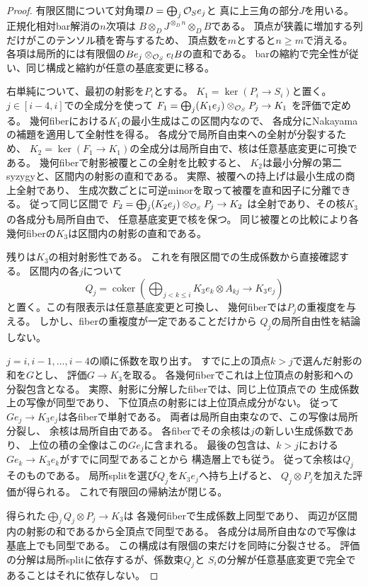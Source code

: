 \begin{proof}
有限区間について対角環$D=\bigoplus_j\mathcal O_S e_j$と
真に上三角の部分$J$を用いる。
正規化相対bar解消の$n$次項は
$B\otimes_D J^{\otimes_D n}\otimes_D B$である。
頂点が狭義に増加する列だけがこのテンソル積を寄与するため、
頂点数を$m$とすると$n\ge m$で消える。
各項は局所的には有限個の$Be_j\otimes_{\mathcal O_S} e_lB$の直和である。
barの縮約で完全性が従い、同じ構成と縮約が任意の基底変更に移る。

右単純について、最初の射影を$P_i$とする。
$K_1=\ker(P_i\to S_i)$と置く。
$j\in[i-4,i]$での全成分を使って
$F_1=\bigoplus_j (K_1e_j)\otimes_{\mathcal O_S}P_j\to K_1$
を評価で定める。
幾何fiberにおける$K_1$の最小生成はこの区間内なので、
各成分にNakayamaの補題を適用して全射性を得る。
各成分で局所自由束への全射が分裂するため、
$K_2=\ker(F_1\to K_1)$の全成分は局所自由で、核は任意基底変更に可換である。
幾何fiberで射影被覆とこの全射を比較すると、
$K_2$は最小分解の第二syzygyと、区間内の射影の直和である。
実際、被覆への持上げは最小生成の商上全射であり、
生成次数ごとに可逆minorを取って被覆を直和因子に分離できる。
従って同じ区間で
$F_2=\bigoplus_j (K_2e_j)\otimes_{\mathcal O_S}P_j\to K_2$
は全射であり、その核$K_3$の各成分も局所自由で、
任意基底変更で核を保つ。
同じ被覆との比較により各幾何fiberの$K_3$は区間内の射影の直和である。

残りは$K_3$の相対射影性である。
これを有限区間での生成係数から直接確認する。
区間内の各$j$について
\[
 Q_j=\operatorname{coker}\left(
       \bigoplus_{j<k\leq i}K_3e_k\otimes A_{kj}
                       \longrightarrow K_3e_j\right)
\]
と置く。この有限表示は任意基底変更と可換し、
幾何fiberでは$P_j$の重複度を与える。
しかし、fiberの重複度が一定であることだけから
$Q_j$の局所自由性を結論しない。

$j=i,i-1,\ldots,i-4$の順に係数を取り出す。
すでに上の頂点$k>j$で選んだ射影の和を$G$とし、
評価$G\to K_3$を取る。
各幾何fiberでこれは上位頂点の射影和への分裂包含となる。
実際、射影に分解したfiberでは、同じ上位頂点での
生成係数上の写像が同型であり、
下位頂点の射影には上位頂点成分がない。
従って$Ge_j\to K_3e_j$は各fiberで単射である。
両者は局所自由束なので、この写像は局所分裂し、
余核は局所自由である。
各fiberでその余核は$j$の新しい生成係数であり、
上位の積の全像はこの$Ge_j$に含まれる。
最後の包含は、$k>j$における
$Ge_k\to K_3e_k$がすでに同型であることから
構造層上でも従う。
従って余核は$Q_j$そのものである。
局所splitを選び$Q_j$を$K_3e_j$へ持ち上げると、
$Q_j\otimes P_j$を加えた評価が得られる。
これで有限回の帰納法が閉じる。

得られた$\bigoplus_jQ_j\otimes P_j\to K_3$は
各幾何fiberで生成係数上同型であり、
両辺が区間内の射影の和であるから全頂点で同型である。
各成分は局所自由なので写像は基底上でも同型である。
この構成は有限個の束だけを同時に分裂させる。
評価の分解は局所splitに依存するが、係数束$Q_j$と
$S_i$の分解が任意基底変更で完全であることはそれに依存しない。


\end{proof}
